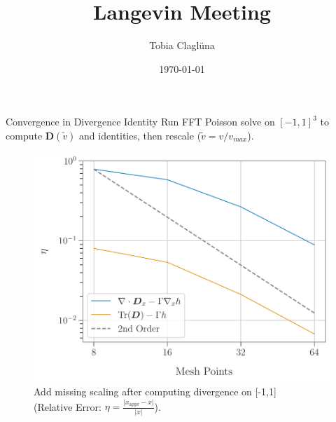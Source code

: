 

\title[\today]{Langevin Meeting}

\author{Tobia Claglüna}
\date{\today}
\def \myEmail {tobia.clagluena@psi.ch}




\begin{frame}[c]{Convergence in Divergence Identity}
    Run FFT Poisson solve on $[-1,1]^3$ to compute $\boldsymbol D(\tilde v)$ and identities, then
    rescale ($\tilde v = v/v_{max}$).
    \begin{figure}[!htb]
        \centering
        \captionsetup{justification=centering}
      \includegraphics[width=0.65\linewidth]{figures/identities_convergence_sigma20.pdf}
      \caption{Add missing scaling after computing divergence on [-1,1] \\ (Relative Error: $\eta =
      \frac{\lvert x_{\text{appr}}-x \rvert}{\lvert x \rvert}$).}
      \label{fig:identity_convergence}
    \end{figure}
\end{frame}

